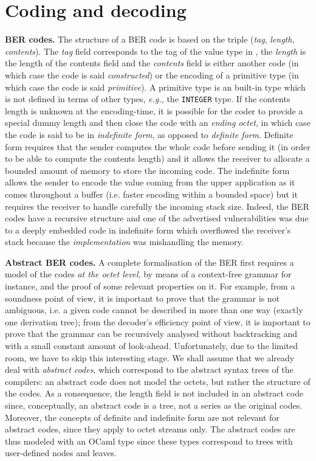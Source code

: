 
\section{Coding and decoding}

\textbf{BER codes.} The structure of a BER code is based on the triple
(\emph{tag}, \emph{length}, \emph{contents}). The \emph{tag} field
corresponds to the tag of the value type in \ASN, the \emph{length} is
the length of the contents field and the \emph{contents} field is
either another code (in which case the code is said
\emph{constructed}) or the encoding of a primitive type (in which case
the code is said \emph{primitive}). A primitive type is an \ASN
built-in type which is not defined in terms of other types,
\emph{e.g.,} the \texttt{\small INTEGER} type. If the contents length
is unknown at the encoding-time, it is possible for the coder to
provide a special dummy length and then close the code with an
\emph{ending octet}, in which case the code is said to be in
\emph{indefinite form}, as opposed to \emph{definite form}. Definite
form requires that the sender computes the whole code before sending
it (in order to be able to compute the contents length) and it allows
the receiver to allocate a bounded amount of memory to store the
incoming code. The indefinite form allows the sender to encode the
value coming from the upper application as it comes throughout a
buffer (i.e. faster encoding within a bounded space) but it requires
the receiver to handle carefully the incoming stack size. Indeed, the
BER codes have a recursive structure and one of the advertised
vulnerabilities was due to a deeply embedded code in indefinite form
which overflowed the receiver's stack because the
\emph{implementation} was mishandling the memory.

\medskip

\textbf{Abstract BER codes.} A complete formalisation of the BER first
requires a model of the codes \emph{at the octet level}, by means of a
context-free grammar for instance, and the proof of some relevant
properties on it. For example, from a soundness point of view, it is
important to prove that the grammar is not ambiguous, i.e. a given
code cannot be described in more than one way (exactly one derivation
tree); from the decoder's efficiency point of view, it is important to
prove that the grammar can be recursively analysed without
backtracking and with a small constant amount of
look-ahead. Unfortunately, due to the limited room, we have to skip
this interesting stage. We shall assume that we already deal with
\emph{abstract codes}, which correspond to the abstract syntax trees
of the compilers: an abstract code does not model the octets, but
rather the structure of the codes. As a consequence, the length field
is not included in an abstract code since, conceptually, an abstract
code is a tree, not a series as the original codes. Moreover, the
concepts of definite and indefinite form are not relevant for abstract
codes, since they apply to octet streams only. The abstract codes are
thus modeled with an OCaml type since these types correspond to trees
with user-defined nodes and leaves.

